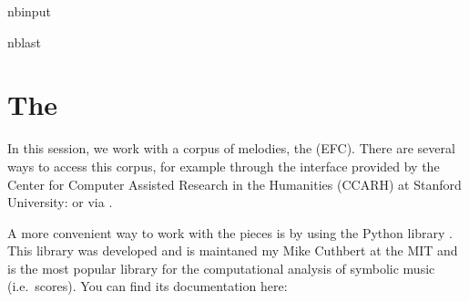 \documentclass[letterpaper,10pt,english]{sphinxmanual}
\begin{document}
\begin{sphinxuseclass}{nbinput}
\begin{sphinxuseclass}{nblast}
{
\begin{sphinxVerbatim}[commandchars=\\\{\}]
\llap{\color{nbsphinxin}[2]:\,\hspace{\fboxrule}\hspace{\fboxsep}}

\end{sphinxVerbatim}
}

\end{sphinxuseclass}
\end{sphinxuseclass}

\section{The }
\label{\detokenize{03_melody_I:The-Essen-Folksong-Collection}}
\sphinxAtStartPar
In this session, we work with a corpus of melodies, the  (EFC). There are several ways to access this corpus, for example through the interface provided by the Center for Computer Assisted Research in the Humanities (CCARH) at Stanford University:  or via .

\sphinxAtStartPar
A more convenient way to work with the pieces is by using the Python library . This library was developed and is maintaned my Mike Cuthbert at the MIT and is the most popular library for the computational analysis of symbolic music (i.e. scores). You can find its documentation here: 
\end{document}
